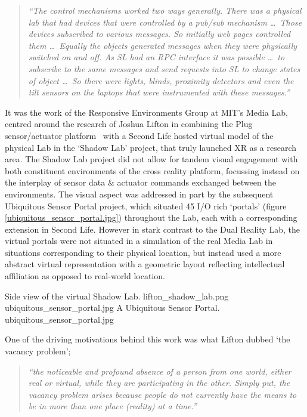 \begin{quote}
\textit{``The control mechanisms worked two ways generally. There was a physical lab that had devices that were controlled by a pub/sub mechanism \ldots\ Those devices subscribed to various messages. So initially web pages controlled them \ldots\ Equally the objects generated messages when they were physically switched on and off. As SL\SLfootnote{} had an RPC interface it was possible \ldots\ to subscribe to the same messages and send requests into SL to change states of object \ldots\ So there were lights, blinds, proximity detectors and even the tilt sensors on the laptops that were instrumented with these messages.''}
\end{quote}

It was the work of the Responsive Environments Group at MIT's Media Lab, centred around the research of Joshua Lifton in combining the Plug sensor/actuator platform~\cite{Lifton2007b} with a Second Life hosted virtual model of the physical Lab in the `Shadow Lab' project, that truly launched XR as a research area. The Shadow Lab project did not allow for tandem visual engagement with both constituent environments of the cross reality platform, focussing instead on the interplay of sensor data \& actuator commands exchanged between the environments. The visual aspect was addressed in part by the subsequent Ubiquitous Sensor Portal project, which situated 45 I/O rich `portals' (figure \ref{ubiquitous_sensor_portal.jpg}) throughout the Lab, each with a corresponding extension in Second Life. However in stark contrast to the Dual Reality Lab, the virtual portals were not situated in a simulation of the real Media Lab in situations corresponding to their physical location, but instead used a more abstract virtual representation with a geometric layout reflecting intellectual affiliation as opposed to real-world location.

 {Side view of the virtual Shadow Lab.} {lifton_shadow_lab.png}
       {ubiquitous_sensor_portal.jpg} {A Ubiquitous Sensor Portal.} {ubiquitous_sensor_portal.jpg}

One of the driving motivations behind this work was what Lifton dubbed `the vacancy problem';

\begin{quote}
\textit{``the noticeable and profound absence of a person from one world, either real or virtual, while they are participating in the other. Simply put, the vacancy problem arises because people do not currently have the means to be in more than one place (reality) at a time.''}~\cite{Lifton2007a}
\end{quote}


